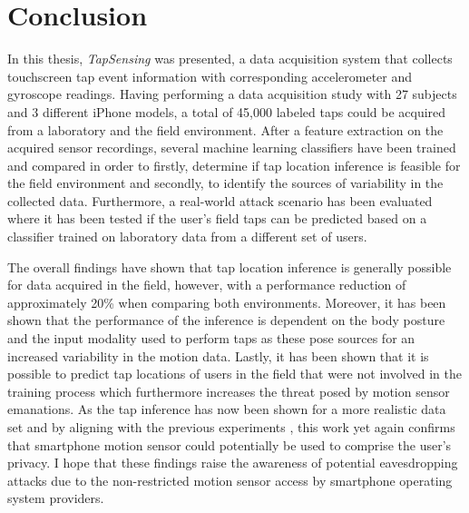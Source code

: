 \chapter{Conclusion\label{cha:chapter7}}
In this thesis, \textit{TapSensing} was presented, a data acquisition system that collects touchscreen tap event information with corresponding accelerometer and gyroscope readings. Having performing a data acquisition study with 27 subjects and 3 different iPhone models, a total of 45,000 labeled taps could be acquired from a laboratory and the field environment. After a feature extraction on the acquired sensor recordings, several machine learning classifiers have been trained and compared in order to firstly, determine if tap location inference is feasible for the field environment and secondly, to identify the sources of variability in the collected data. Furthermore, a real-world attack scenario has been evaluated where it has been tested if the user's field taps can be predicted based on a classifier trained on laboratory data from a different set of users.

The overall findings have shown that tap location inference is generally possible for data acquired in the field, however, with a performance reduction of approximately 20\% when comparing both environments. Moreover, it has been shown that the performance of the inference is dependent on the body posture and the input modality used to perform taps as these pose sources for an increased variability in the motion data. Lastly, it has been shown that it is possible to predict tap locations of users in the field that were not involved in the training process which furthermore increases the threat posed by motion sensor emanations. As the tap inference has now been shown for a more realistic data set and by aligning with the previous experiments \cite{Touchlogger, Tapprints, Accessory}, this work yet again confirms that smartphone motion sensor could potentially be used to comprise the user's privacy. I hope that these findings raise the awareness of potential eavesdropping attacks due to the non-restricted motion sensor access by smartphone operating system providers.



